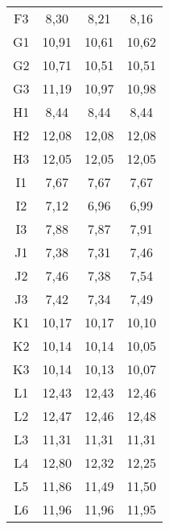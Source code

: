 \begin{center}
\begin{longtable}{cccc}
    F3    & 8,30  & 8,21  & 8,16 \\
    G1    & 10,91 & 10,61 & 10,62 \\
    G2    & 10,71 & 10,51 & 10,51 \\
    G3    & 11,19 & 10,97 & 10,98 \\
    H1    & 8,44  & 8,44  & 8,44 \\
    H2    & 12,08 & 12,08 & 12,08 \\
    H3    & 12,05 & 12,05 & 12,05 \\
    I1    & 7,67  & 7,67  & 7,67 \\
    I2    & 7,12  & 6,96  & 6,99 \\
    I3    & 7,88  & 7,87  & 7,91 \\
    J1    & 7,38  & 7,31  & 7,46 \\
    J2    & 7,46  & 7,38  & 7,54 \\
    J3    & 7,42  & 7,34  & 7,49 \\
    K1    & 10,17 & 10,17 & 10,10 \\
    K2    & 10,14 & 10,14 & 10,05 \\
    K3    & 10,14 & 10,13 & 10,07 \\
    L1    & 12,43 & 12,43 & 12,46 \\
    L2    & 12,47 & 12,46 & 12,48 \\
    L3    & 11,31 & 11,31 & 11,31 \\
    L4    & 12,80 & 12,32 & 12,25 \\
    L5    & 11,86 & 11,49 & 11,50 \\
    L6    & 11,96 & 11,96 & 11,95 \\
\end{longtable}
\end{center}

